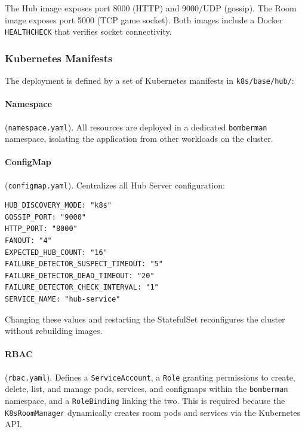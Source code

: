 The Hub image exposes port 8000 (HTTP) and 9000/UDP (gossip).
The Room image exposes port 5000 (TCP game socket).
Both images include a Docker \texttt{HEALTHCHECK} that verifies socket connectivity.

\subsubsection{Kubernetes Manifests}

The deployment is defined by a set of Kubernetes \cite{kubernetes} manifests in \texttt{k8s/base/hub/}:

\paragraph{Namespace} (\texttt{namespace.yaml}).
All resources are deployed in a dedicated \texttt{bomberman} namespace, isolating the application from other workloads on the cluster.

\paragraph{ConfigMap} (\texttt{configmap.yaml}).
Centralizes all Hub Server configuration:
\begin{verbatim}
HUB_DISCOVERY_MODE: "k8s"
GOSSIP_PORT: "9000"
HTTP_PORT: "8000"
FANOUT: "4"
EXPECTED_HUB_COUNT: "16"
FAILURE_DETECTOR_SUSPECT_TIMEOUT: "5"
FAILURE_DETECTOR_DEAD_TIMEOUT: "20"
FAILURE_DETECTOR_CHECK_INTERVAL: "1"
SERVICE_NAME: "hub-service"
\end{verbatim}
Changing these values and restarting the StatefulSet reconfigures the cluster without rebuilding images.

\paragraph{RBAC} (\texttt{rbac.yaml}).
Defines a \texttt{ServiceAccount}, a \texttt{Role} granting permissions to create, delete, list, and manage pods, services, and configmaps within the \texttt{bomberman} namespace, and a \texttt{RoleBinding} linking the two.
This is required because the \texttt{K8sRoomManager} dynamically creates room pods and services via the Kubernetes API.

